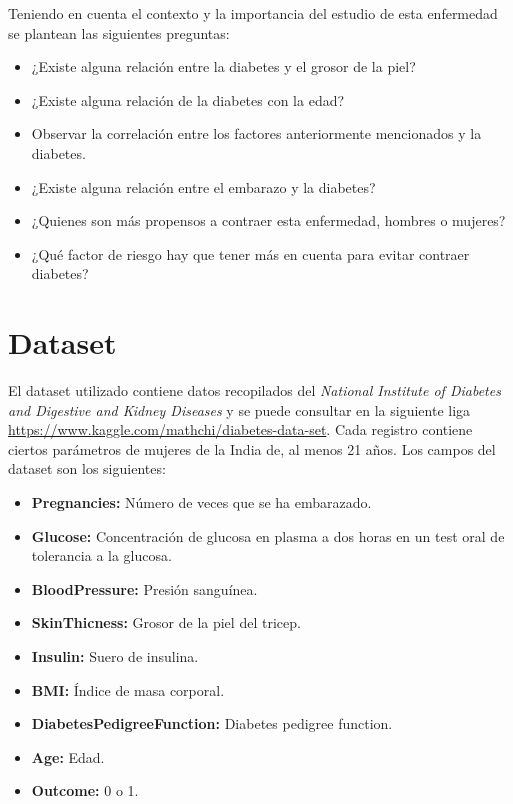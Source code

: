 \documentclass{article}
\begin{document}
Teniendo en cuenta el contexto y la importancia del estudio de esta enfermedad se plantean las siguientes preguntas:
\begin{itemize}
	\item ¿Existe alguna relación entre la diabetes y el grosor de la piel?
	\item ¿Existe alguna relación de la diabetes con la edad?
	\item Observar la correlación entre los factores anteriormente mencionados y la diabetes.
	\item ¿Existe alguna relación entre el embarazo y la diabetes?
	\item ¿Quienes son más propensos a contraer esta enfermedad, hombres o mujeres?
	\item ¿Qué factor de riesgo hay que tener más en cuenta para evitar contraer diabetes?
\end{itemize}


\section{Dataset}

El dataset utilizado contiene datos recopilados del \emph{National Institute of Diabetes and Digestive and Kidney Diseases} y se puede consultar en la siguiente liga \url{https://www.kaggle.com/mathchi/diabetes-data-set}. Cada registro contiene ciertos parámetros de mujeres de la India de, al menos 21 años. Los campos del dataset son los siguientes:

\begin{itemize}
	\item \textbf{Pregnancies:} Número de veces que se ha embarazado.
	\item \textbf{Glucose:} Concentración de glucosa en plasma a dos horas en un test oral de tolerancia a la glucosa. 
	\item \textbf{BloodPressure:} Presión sanguínea.
	\item \textbf{SkinThicness:} Grosor de la piel del tricep.
	\item \textbf{Insulin:} Suero de insulina.
	\item \textbf{BMI:} Índice de masa corporal.
	\item \textbf{DiabetesPedigreeFunction:} Diabetes pedigree function.
	\item \textbf{Age:} Edad.
	\item \textbf{Outcome:} 0 o 1.
\end{itemize}
\end{document}
